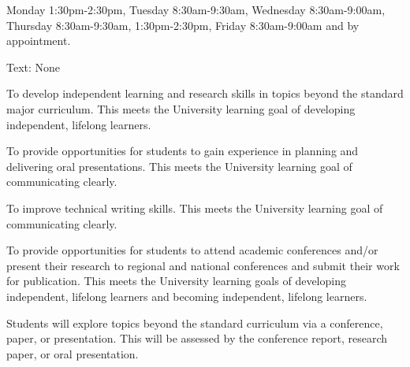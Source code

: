 \documentclass[11pt]{article}
\begin{document}
{Monday 1:30pm-2:30pm,  Tuesday 8:30am-9:30am, Wednesday 8:30am-9:00am,} { Thursday 8:30am-9:30am, 1:30pm-2:30pm, Friday 8:30am-9:00am and by appointment.}




%

Text: None


\SyllabusBeginGoals{}

\item
To develop independent learning and research skills in topics beyond the standard major curriculum. This meets the University learning goal of developing independent, lifelong learners.

\item
To provide opportunities for students to gain experience in planning and delivering oral presentations. This meets the University learning goal of communicating clearly.

\item
To improve technical writing skills. This meets the University learning goal of communicating clearly.

\item
To provide opportunities for students to attend academic conferences and/or present their research to regional and national conferences and submit their work for publication. This meets the University learning goals of developing independent, lifelong learners and becoming independent, lifelong learners.

\SyllabusEndGoals{}


\SyllabusBeginOutcomes{}

\item
Students will explore topics beyond the standard curriculum via a conference, paper, or presentation. This will be assessed by the conference report, research paper, or oral presentation.
\end{document}
